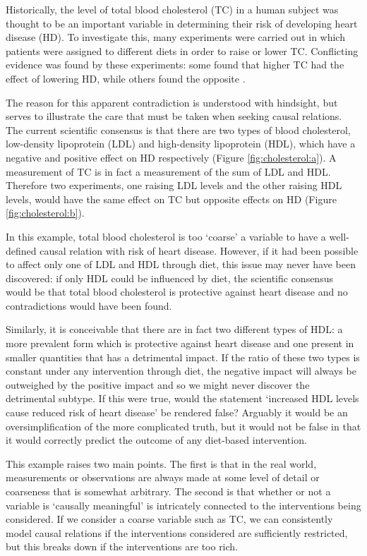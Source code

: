 Historically, the level of total blood cholesterol (TC) in a human subject was thought to be an important variable in determining their risk of developing heart disease (HD).
To investigate this, many experiments were carried out in which patients were assigned to different diets in order to raise or lower TC\@.
Conflicting evidence was found by these experiments: some found that higher TC had the effect of lowering HD, while others found the opposite \citep{truswell2010cholesterol,steinberg2011cholesterol}.

The reason for this apparent contradiction is understood with hindsight, but serves to illustrate the care that must be taken when seeking causal relations. 
The current scientific consensus is that there are two types of blood cholesterol, low-density lipoprotein (LDL) and high-density lipoprotein (HDL), which have a negative and positive effect on HD respectively (Figure \ref{fig:cholesterol:a}).
A measurement of TC is in fact a measurement of the sum of LDL and HDL.
Therefore two experiments, one raising LDL levels and the other raising HDL levels, would have the same effect on TC but opposite effects on HD (Figure \ref{fig:cholesterol:b}).

In this example, total blood cholesterol is too `coarse' a variable to have a well-defined causal relation with risk of heart disease. 
However, if it had been possible to affect only one of LDL and HDL through diet, this issue may never have been discovered:
if only HDL could be influenced by diet, the scientific consensus would be that total blood cholesterol is protective against heart disease and no contradictions would have been found.

Similarly, it is conceivable that there are in fact two different types of HDL: a more prevalent form which is protective against heart disease and one present in smaller quantities that has a detrimental impact. 
If the ratio of these two types is constant under any intervention through diet, the negative impact will always be outweighed by the positive impact and so we might never discover the detrimental subtype. 
If this were true, would the statement `increased HDL levels cause reduced risk of heart disease' be rendered false? 
Arguably it would be an oversimplification of the more complicated truth, but it would not be false in that it would correctly predict the outcome of any diet-based intervention.

This example raises two main points. The first is that in the real world, measurements or observations are always made at some level of detail or coarseness that is somewhat arbitrary.
The second is that whether or not a variable is `causally meaningful' is intricately connected to the interventions being considered. If we consider a coarse variable such as TC, we can consistently model causal relations if the interventions considered are sufficiently restricted, but this breaks down if the interventions are too rich. 

